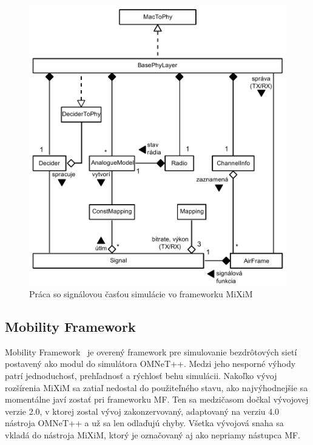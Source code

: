 \begin{figure}[htbp]
\begin{center}
\includegraphics[width=140mm]{figures/architecture_mixim}
\caption{Práca so signálovou časťou simulácie vo frameworku MiXiM}
\label{fig:architecture_mixim}
\end{center}
\end{figure}

\subsection{Mobility Framework}
\indent\indent Mobility Framework~\cite{mf_homepage} je overený framework pre simulovanie bezdrôtových sietí postavený ako modul do simulátora OMNeT++. Medzi jeho nesporné výhody patrí jednoduchosť, prehľadnosť a rýchlosť behu simulácii. Nakoľko vývoj rozšírenia MiXiM sa zatiaľ nedostal do použiteľného stavu, ako najvýhodnejšie sa momentálne javí zostať pri frameworku MF. Ten sa medzičasom dočkal vývojovej verzie 2.0, v ktorej zostal vývoj zakonzervovaný, adaptovaný na verziu 4.0 nástroja OMNeT++ a už sa len odlaďujú chyby. Všetka vývojová snaha sa vkladá do nástroja MiXiM, ktorý je označovaný aj ako nepriamy nástupca MF.\\

